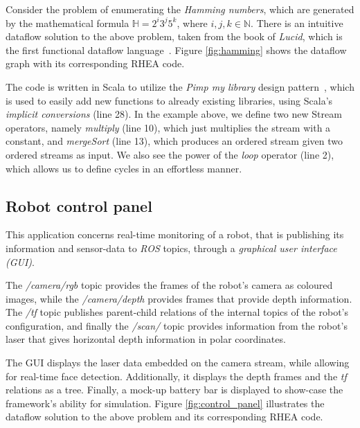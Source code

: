 \documentclass[sigplan,review,anonymous]{acmart}
\begin{document}
Consider the problem of enumerating the
\textit{Hamming numbers}, which are generated by the mathematical formula
$\mathbb{H} = 2^i3^j5^k$, where $i,j,k \in \mathbb{N}$. There is an intuitive
dataflow solution to the above problem, taken from the book of \textit{Lucid},
which is the first functional dataflow language~\cite{lucid}. Figure
\ref{fig:hamming} shows the dataflow graph with its corresponding \textsc{RHEA}
code.


The code is written in Scala to utilize the \textit{Pimp my library} design
pattern~\cite{pimp}, which is used to easily add new functions to already
existing libraries, using Scala's \textit{implicit conversions} (line 28). In
the example above, we define two new Stream operators, namely \textit{multiply}
(line 10), which just multiplies the stream with a constant, and
\textit{mergeSort} (line 13), which produces an ordered stream given two ordered
streams as input. We also see the power of the \textit{loop} operator (line 2),
which allows us to define cycles in an effortless manner.

\subsection{Robot control panel}

This application concerns real-time monitoring of a robot, that is publishing
its information and sensor-data to \textit{ROS} topics, through a
\textit{graphical user interface (GUI)}.

The \textit{/camera/rgb} topic provides the frames of the robot's camera as
coloured images, while the \textit{/camera/depth} provides frames that provide
depth information. The \textit{/tf} topic publishes parent-child relations of
the internal topics of the robot's configuration, and finally the
\textit{/scan/} topic provides information from the robot's laser that gives
horizontal depth information in polar coordinates.

The GUI displays the laser data embedded on the camera stream, while allowing
for real-time face detection. Additionally, it displays the depth frames and the
\textit{tf} relations as a tree. Finally, a mock-up battery bar is displayed to
show-case the framework's ability for simulation. Figure \ref{fig:control_panel}
illustrates the dataflow solution to the above problem and its corresponding
\textsc{RHEA} code.

\end{document}
